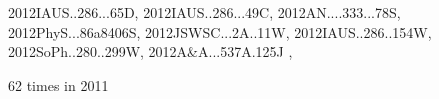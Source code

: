 \documentclass[12pt]{article}
\begin{document}
\begin{description}
{2012IAUS..286...65D,%
2012IAUS..286...49C,%
2012AN....333...78S,%
2012PhyS...86a8406S,%
2012JSWSC...2A..11W,%
2012IAUS..286..154W,%
2012SoPh..280..299W,%
2012A&A...537A.125J%
},\item
62 times in 2011 \citep{
2011A&A...530L...7G,%
2011A&A...528A...6G,%
2011sf2a.conf..215G,%
2011MNRAS.418.1356R,%
2011AN....332..883K,%
2011A&A...531A.162K,%
2011ApJ...742...34K,%
2011AN....332..876M,%
2011PhRvE..84e6314R,%
2011ESS.....2.3302L,%
2011IAUS..274...50J,%
2011IAUS..276...89J,%
2011PhRvE..84d6321R,%
2011arXiv1110.1163T,%
2011ApJ...740...18O,%
2011A&A...534A.122R,%
2011A&A...534A.107F,%
}
\end{description}
\end{document}
